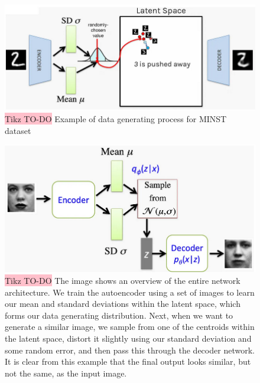 \begin{figure}[!htbp]
    \centering
    \includegraphics[width=\linewidth]{tikz/VAE generating process.png}
    \caption{{\color{red}\colorbox{pink}{Tikz TO-DO}} Example of data generating process for MINST dataset}
    \label{fig:VAE-generating-process}
\end{figure}


\begin{figure}[!htbp]
    \centering
    \includegraphics[width=\linewidth]{tikz/VAE entire process.png}
    \caption{{\color{red}\colorbox{pink}{Tikz TO-DO}} The image shows an overview of the entire network architecture. We train the autoencoder using a set of images to learn our mean and standard deviations within the latent space, which forms our data generating distribution. Next, when we want to generate a similar image, we sample from one of the centroids within the latent space, distort it slightly using our standard deviation and some random error, and then pass this through the decoder network. It is clear from this example that the final output looks similar, but not the same, as the input image.}
    \label{fig:VAE-entire-process}
\end{figure}


